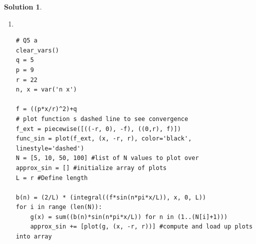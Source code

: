 \documentclass[10pt]{article}
\makeatletter
\theoremstyle{definition}
\newtheorem{soln}{Solution}
\newcommand{\boxspacing}{\kern\kvtcb@left@rule\kern\kvtcb@boxsep}
\newcommand{\prompt}[4]{
    \ttfamily\llap{{\color{#2}[#3]:\hspace{3pt}#4}}\vspace{-\baselineskip}
}
\makeatother
\begin{document}
\begin{soln}
  \begin{enumerate}[label=(\alph*)]
    \item ~\begin{tcolorbox}[breakable, size=fbox, boxrule=1pt, pad at break*=1mm,colback=cellbackground, colframe=cellborder]
            \prompt{In}{incolor}{1}{\boxspacing}
            \begin{verbatim}
# Q5 a
clear_vars()
q = 5
p = 9
r = 22
n, x = var('n x')

f = ((p*x/r)^2)+q
# plot function s dashed line to see convergence
f_ext = piecewise([((-r, 0), -f), ((0,r), f)])
func_sin = plot(f_ext, (x, -r, r), color='black', linestyle='dashed')
N = [5, 10, 50, 100] #list of N values to plot over
approx_sin = [] #initialize array of plots
L = r #Define length

b(n) = (2/L) * (integral((f*sin(n*pi*x/L)), x, 0, L))
for i in range (len(N)):
    g(x) = sum((b(n)*sin(n*pi*x/L)) for n in (1..(N[i]+1)))
    approx_sin += [plot(g, (x, -r, r))] #compute and load up plots into array



\end{verbatim}
\end{tcolorbox}
\end{enumerate}
\end{soln}
\end{document}
